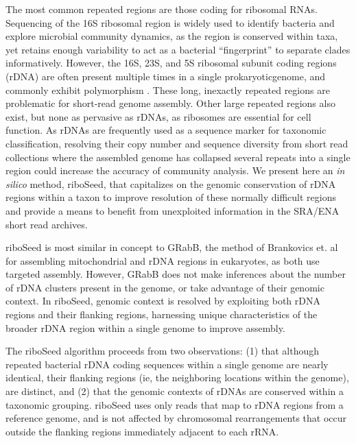 \documentclass[10pt]{article}
\begin{document}
\begin{linenumbers}
The most common repeated regions are those coding for ribosomal RNAs. Sequencing of the 16S ribosomal region is widely used to identify bacteria and explore microbial community dynamics\cite{Weisburg1991,Clarridge2004,Woese1990,Case2007}, as the region is conserved within taxa, yet retains enough variability to act as a bacterial ``fingerprint'' to separate clades informatively. However, the 16S, 23S, and 5S ribosomal subunit coding regions (rDNA) are often present multiple times in a single prokaryoticgenome, and commonly exhibit polymorphism \cite{Coenye2003,Moreno2002,Lukjancenko2010,Vetrovsky2013}. These long, inexactly repeated regions\cite{Alkan2011} are problematic for short-read genome assembly. Other large repeated regions also exist, but none as pervasive as rDNAs, as ribosomes are essential for cell function. As rDNAs are frequently used as a sequence marker for taxonomic classification, resolving their copy number and sequence diversity from short read collections where the assembled genome has collapsed several repeats into a single region could increase the accuracy of community analysis. We present here an \textit{in silico} method, riboSeed, that capitalizes on the genomic conservation of rDNA regions within a taxon to improve resolution of these normally difficult regions and provide a means to benefit from unexploited information in the SRA/ENA short read archives.


riboSeed is most similar in concept to GRabB, the method of Brankovics et. al \cite{Brankovics2016} for assembling mitochondrial and rDNA regions in eukaryotes, as both use targeted assembly. However, GRabB does not make inferences about the number of rDNA clusters present in the genome, or take advantage of their genomic context. In riboSeed, genomic context is resolved by exploiting both rDNA regions and their flanking regions, harnessing unique characteristics of the broader rDNA region within a single genome to improve assembly.


The riboSeed algorithm proceeds from two observations: (1) that although repeated bacterial rDNA coding sequences within a single genome are nearly identical, their flanking regions (ie, the neighboring locations within the genome), are distinct, and (2) that the genomic contexts of rDNAs  are conserved within a taxonomic grouping. riboSeed uses only reads that map to rDNA regions from a reference genome, and is not affected by chromosomal rearrangements that occur outside the flanking regions immediately adjacent to each rRNA.



\end{linenumbers}
\end{document}
